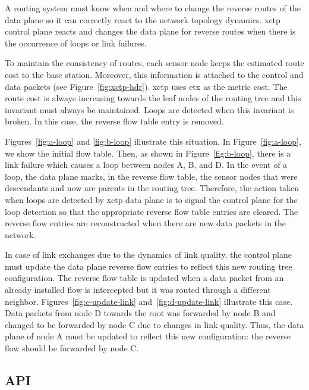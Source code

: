 A routing system must know when and where to change the reverse routes of the data plane so it can correctly react to the network topology dynamics. \ac{xctp} control plane reacts and changes the data plane for reverse routes when there is the occurrence of loops or link failures.

To maintain the consistency of routes, each sensor node keeps the estimated route cost to the base station. Moreover, this information is attached to the control and data packets (see Figure~\ref{fig:xctp-hdr}). \ac{xctp} uses \ac{etx} as the metric cost. The route cost is always increasing towards the leaf nodes of the routing tree and this invariant must always be maintained. Loops are detected when this invariant is broken. In this case, the reverse flow table entry is removed.

Figures~\ref{fig:a-loop} and \ref{fig:b-loop} illustrate this situation. In Figure~\ref{fig:a-loop}, we show the initial flow table. Then, as shown in Figure~\ref{fig:b-loop}, there is a link failure which causes a loop between nodes A, B, and D. In the event of a loop, the data plane marks, in the reverse flow table, the sensor nodes that were descendants and now are parents in the routing tree. Therefore, the action taken when loops are detected by \ac{xctp} data plane is to signal the control plane for the loop detection so that the appropriate reverse flow table entries are cleared. The reverse flow entries are reconstructed when there are new data packets in the network.

In case of link exchanges due to the dynamics of link quality, the control plane must update the data plane reverse flow entries to reflect this new routing tree configuration. The reverse flow table is updated when a data packet from an already installed flow is intercepted but it was routed through a different neighbor. Figures~\ref{fig:c-update-link} and~\ref{fig:d-update-link} illustrate this case. Data packets from node D towards the root was forwarded by node B and changed to be forwarded by node C due to changes in link quality. Thus, the data plane of node A must be updated to reflect this new configuration: the reverse flow should be forwarded by node C.

\subsection{API}
\label{sec:api}



